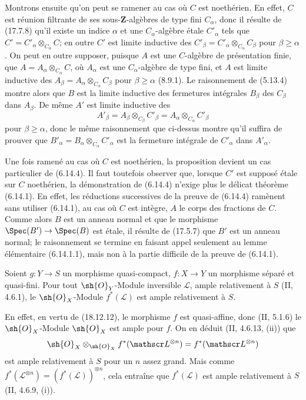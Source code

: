 Montrons ensuite qu'on peut se ramener au cas où $C$ est noethérien. En effet, $C$ est réunion filtrante de ses sous-$\mathbf Z$-algèbres de type fini $C_\alpha$, donc il résulte de (17.7.8) qu'il existe un indice $\alpha$ et une $C_\alpha$-algèbre étale $C'_\alpha$ tels que $C'=C'_\alpha\otimes_{C_\alpha}C$; en outre $C'$ est limite inductive des $C'_\beta=C'_\alpha\otimes_{C_\alpha}C_\beta$ pour $\beta\geq\alpha$. On peut en outre supposer, puisque $A$ est une $C$-algèbre de présentation finie, que $A=A_\alpha\otimes_{C_\alpha}C$, où $A_\alpha$ est une $C_\alpha$-algèbre de type fini, et $A$ est limite inductive des $A_\beta=A_\alpha\otimes_{C_\alpha}C_\beta$ pour $\beta\geq\alpha$ (8.9.1). Le raisonnement de (5.13.4) montre alors que $B$ est la limite inductive des fermetures intégrales $B_\beta$ des $C_\beta$ dans $A_\beta$. De même $A'$ est limite inductive des
\[
  A'_\beta=A_\beta\otimes_{C_\beta}C'_\beta=A_\alpha\otimes_{C_\alpha}C'_\beta
\]
pour $\beta\geq\alpha$, donc le même raisonnement que ci-dessus montre qu'il suffira de prouver que $B'_\alpha=B_\alpha\otimes_{C_\alpha}C'_\alpha$ est la fermeture intégrale de $C'_\alpha$ dans $A'_\alpha$.

Une fois ramené au cas où $C$ est noethérien, la proposition devient un cas particulier de (6.14.4). Il faut toutefois observer que, lorsque $C'$ est supposé étale sur $C$ noethérien, la démonstration de (6.14.4) n'exige plus le délicat théorème (6.14.1). En effet, les réductions successives de la preuve de (6.14.4) ramènent sans utiliser (6.14.1), au cas où $C$ est intègre, $A$ le corps des fractions de $C$. Comme alors $B$ est un anneau normal et que le morphisme $\Spec(B')\to\Spec(B)$ est étale, il résulte de (17.5.7) que $B'$ est un anneau normal; le raisonnement se termine en faisant appel seulement au lemme élémentaire (6.14.1.1), mais non à la partie difficile de la preuve de (6.14.1).

\begin{proposition}[18.12.16]
\label{IV.18.12.16}
Soient $g:Y\to S$ un morphisme quasi-compact, $f:X\to Y$ un morphisme séparé et quasi-fini. Pour tout $\sh{O}_Y$-Module inversible $\mathscr L$, ample relativement à $S$ (II, 4.6.1), le $\sh{O}_X$-Module $f^*(\mathscr L)$ est ample relativement à $S$.
\end{proposition}

En effet, en vertu de (18.12.12), le morphisme $f$ est quasi-affine, donc (II, 5.1.6) le $\sh{O}_X$-Module $\sh{O}_X$ est ample pour $f$. On en déduit (II, 4.6.13, (ii)) que
\[
  \sh{O}_X\otimes_{\sh{O}_X}f^*(\mathscr L^{\otimes n})=f^*(\mathscr L^{\otimes n})
\]
est ample relativement à $S$ pour un $n$ assez grand. Mais comme $f^*(\mathscr L^{\otimes n})=(f^*(\mathscr L))^{\otimes n}$, cela entraîne que $f^*(\mathscr L)$ est ample relativement à $S$ (II, 4.6.9, (i)).

